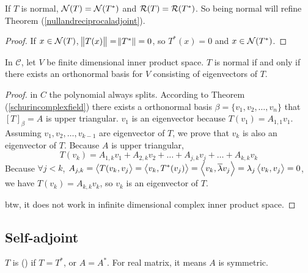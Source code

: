 \begin{theorem}
    If $T$ is normal, $\mathcal{N}(T) = \mathcal{N}(T^*)$ and $\mathcal{R}(T) = \mathcal{R}(T^*)$. So being normal will refine Theorem (\ref{nullandreciprocaladjoint}).
\end{theorem}
\begin{proof}
    If $x \in \mathcal{N}(T)$, $\norm{T(x)} = \norm{T^*} = 0$, so $T^*(x) = 0$ and $x \in \mathcal{N}(T^*)$.
\end{proof}



\begin{theorem}
    In $\mathcal{C}$, let $V$ be finite dimensional inner product space. $T$ is normal if and only if there exists an orthonormal basis for $V$ consisting of eigenvectors of $T$.
\end{theorem}
\begin{proof}
    in $C$ the polynomial always splits. According to Theorem (\ref{schurincomplexfield}) there exists a orthonormal basis $\beta = \{v_1, v_2, \dots, v_n\}$ that $[T]_\beta = A$ is upper triangular. $v_1$ is an eigenvector because $T(v_1)=A_{1,1} v_1$. Assuming $v_1, v_2, \dots, v_{k-1}$ are eigenvector of $T$, we prove that $v_k$ is also an eigenvector of $T$. Because $A$ is upper triangular, 
    \begin{equation*}
        T(v_k) = A_{1,k} v_1 + A_{2,k} v_2 + \dots + A_{j,k} v_j + \dots + A_{k,k} v_k
    \end{equation*}
    Because $\forall j < k$, $A_{j,k} = \left\langle \displaystyle T(v_k, v_j \right\rangle = \left\langle \displaystyle v_k, T^*(v_j) \right\rangle = \left\langle \displaystyle v_k, \overline{\lambda} v_j \right\rangle = \lambda_j \left\langle \displaystyle v_k, v_j \right\rangle = 0$, we have $T(v_k) = A_{k,k} v_k$, so $v_k$ is an eigenvector of $T$.
    
    btw, it does not work in infinite dimensional complex inner product space.
\end{proof}






\subsection{Self-adjoint}

\begin{definition}
    $T$ is  () if $T = T^*$, or $A = A^*$. For real matrix, it means $A$ is symmetric.
\end{definition}

